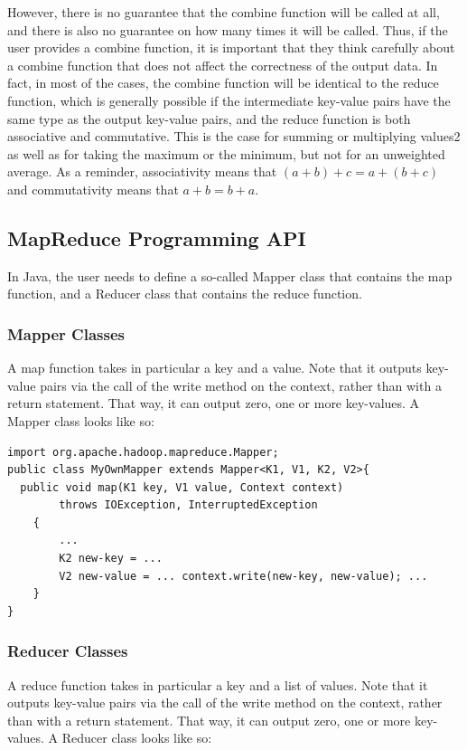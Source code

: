 However, there is no guarantee that the combine function will be called at all, and there is also no guarantee on how many times it will be called. Thus, if the user provides a combine function, it is important that they think carefully about a combine function that does not affect the correctness of the output data. In fact, in most of the cases, the combine function will be identical to the reduce function, which is generally possible if the intermediate key-value pairs have the same type as the output key-value pairs, and the reduce function is both associative and commutative. This is the case for summing or multiplying values2 as well as for taking the maximum or the minimum, but not for an unweighted average. As a reminder, associativity means that $(a + b) + c = a + (b + c)$ and commutativity means that $a + b = b + a$.


\subsection{MapReduce Programming API}

In Java, the user needs to define a so-called Mapper class that contains the map function, and a Reducer class that contains the reduce function.

\subsubsection{Mapper Classes}
A map function takes in particular a key and a value. Note that it outputs key-value pairs via the call of the write method on the context, rather than with a return statement. That way, it can output zero, one or more key-values. A Mapper class looks like so:

\begin{lstlisting}[style=Java]
import org.apache.hadoop.mapreduce.Mapper;
public class MyOwnMapper extends Mapper<K1, V1, K2, V2>{
  public void map(K1 key, V1 value, Context context)
        throws IOException, InterruptedException
    {
        ...
        K2 new-key = ...
        V2 new-value = ... context.write(new-key, new-value); ...
    }
}
\end{lstlisting}

\subsubsection{Reducer Classes}

A reduce function takes in particular a key and a list of values. Note that it outputs key-value pairs via the call of the write method on the context, rather than with a return statement. That way, it can output zero, one or more key-values. A Reducer class looks like so:

